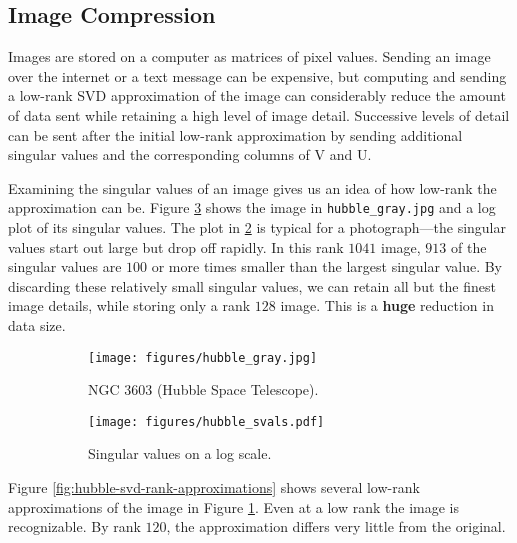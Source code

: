 \subsection*{Image Compression} %

Images are stored on a computer as matrices of pixel values.
Sending an image over the internet or a text message can be expensive, but computing and sending a low-rank SVD approximation of the image can considerably reduce the amount of data sent while retaining a high level of image detail.
Successive levels of detail can be sent after the initial low-rank approximation by sending additional singular values and the corresponding columns of V and U.

Examining the singular values of an image gives us an idea of how low-rank the approximation can be.
Figure \ref{fig:hubble} shows the image in \texttt{hubble\_gray.jpg} and a log plot of its singular values.
The plot in \ref{fig:hubble-log-svals} is typical for a photograph---the singular values start out large but drop off rapidly.
In this rank $1041$ image, $913$ of the singular values are $100$ or more times smaller than the largest singular value.
By discarding these relatively small singular values, we can retain all but the finest image details, while storing only a rank $128$ image.
This is a \textbf{huge} reduction in data size.

\begin{figure}[H] %
\captionsetup[subfigure]{justification=centering}
\centering
\begin{subfigure}{.49\textwidth}
    \centering
    \texttt{[image: figures/hubble\_gray.jpg]}
    \caption{NGC 3603 (Hubble Space Telescope).}
    \label{fig:hubble-original-gray}
\end{subfigure}
%
\begin{subfigure}{.49\textwidth}
    \centering
    \texttt{[image: figures/hubble\_svals.pdf]}
    \caption{Singular values on a log scale.}
    \label{fig:hubble-log-svals}
\end{subfigure}
\caption{}
\label{fig:hubble}
\end{figure}

Figure \ref{fig:hubble-svd-rank-approximations} shows several low-rank approximations of the image in Figure \ref{fig:hubble-original-gray}.
Even at a low rank the image is recognizable.
By rank $120$, the approximation differs very little from the original.

